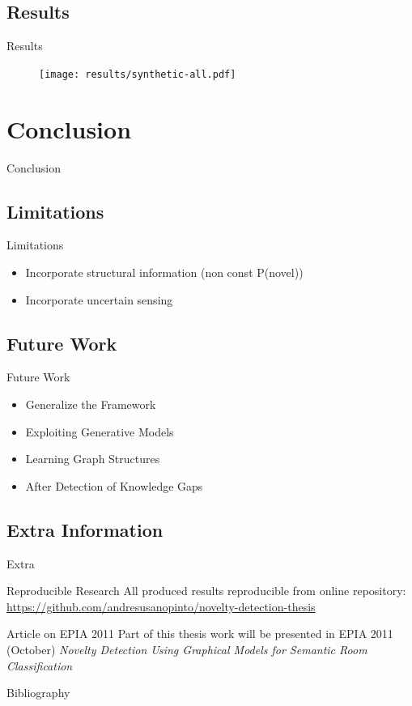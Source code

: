 \documentclass[compress]{beamer}
\begin{document}
\subsection{Results}
\begin{frame}{Results}
  \begin{figure}
    \texttt{[image: results/synthetic-all.pdf]}
  \end{figure}
\end{frame}

\section{Conclusion}
\begin{frame}{Conclusion}
\end{frame}




\subsection{Limitations}
\begin{frame}{Limitations}
\begin{itemize}
\item Incorporate structural information (non const P(novel))
\item Incorporate uncertain sensing
\end{itemize}
\end{frame}

\subsection{Future Work}
\begin{frame}{Future Work}
\begin{itemize}
\item Generalize the Framework
\item Exploiting Generative Models
\item Learning Graph Structures
\item After Detection of Knowledge Gaps
\end{itemize}
\end{frame}

\subsection{Extra Information}
\begin{frame}{Extra}
\begin{block}{Reproducible Research}
All produced results reproducible from online repository:
\url{https://github.com/andresusanopinto/novelty-detection-thesis}
\end{block}

\begin{block}{Article on EPIA 2011}
Part of this thesis work will be presented in EPIA 2011 (October)
\emph{Novelty Detection Using Graphical Models for
Semantic Room Classification}
\end{block}
\end{frame}

\appendix
\begin{frame}[allowframebreaks]{Bibliography}


\end{frame}

\begin{frame}
 \titlepage
\end{frame}
\end{document}
